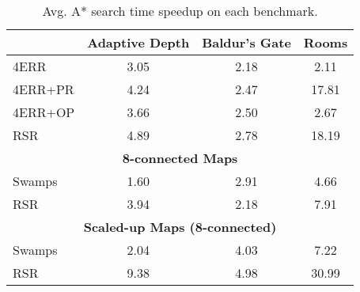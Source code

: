 \begin{table}[tb]
\begin{center}
\begin{tabular}{lccc}
  \hline
 & {\textbf{Adaptive Depth}} & {\textbf{Baldur's Gate}} & {\textbf{Rooms}} \\
  \hline
  4ERR & 3.05 & 2.18 &  2.11 \\ 
  4ERR+PR & 4.24 & 2.47 & 17.81 \\ 
  4ERR+OP & 3.66 &  2.50 & 2.67  \\ 
  RSR & 4.89 & 2.78 & 18.19  \\  
  \hline \hline
   \multicolumn{4}{c}{\textbf{8-connected Maps}} \\ 
	\hline 
  Swamps & 1.60 & 2.91 & 4.66 \\ 
  RSR & 3.94 & 2.18 & 7.91 \\ 
\hline \hline
 \multicolumn{4}{c}{\textbf{Scaled-up Maps (8-connected)}} \\ 
 \hline
  Swamps & 2.04 & 4.03 & 7.22 \\ 
  RSR & 9.38 & 4.98 & 30.99 \\ 
   \hline
\end{tabular}
\end{center}
\caption{Avg. A* search time speedup on each benchmark.} 
\label{table-results}
\end{table}

